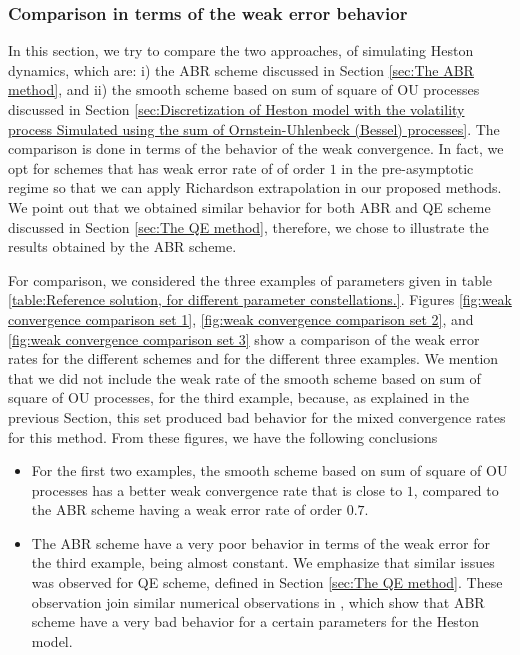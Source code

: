 \subsubsection{Comparison in terms of  the weak error behavior}\label{sec:Comparison in terms of  the weak error behavior}
In this section, we try to compare  the two  approaches,  of simulating Heston dynamics, which are:  i) the ABR scheme discussed in Section \ref{sec:The ABR method}, and ii) the smooth scheme based on sum of square of OU processes discussed in Section \ref{sec:Discretization of Heston model with the volatility process Simulated using the sum of  Ornstein-Uhlenbeck (Bessel) processes}. The comparison is done in terms of the behavior of the weak convergence. In fact, we opt for schemes that has weak error rate of of order $1$ in the pre-asymptotic regime so that we can apply Richardson extrapolation in our proposed methods. We point out that we obtained similar behavior for both  ABR and QE scheme discussed in Section \ref{sec:The QE method}, therefore, we chose to illustrate the results obtained by the ABR scheme.

For comparison, we considered the three examples of parameters given in table \ref{table:Reference solution, for different parameter constellations.}. Figures \ref{fig:weak convergence comparison set 1}, \ref{fig:weak convergence comparison set 2}, and \ref{fig:weak convergence comparison set 3} show a comparison of the weak error rates for the different schemes and for the different three examples.  We mention that we did not include the weak rate of  the smooth scheme based on sum of square of OU processes, for the third example, because, as explained in the previous Section, this set produced bad behavior for the mixed convergence rates for this method.  From these figures, we have the following conclusions
\begin{itemize}
\item For the first two examples,   the smooth scheme based on sum of square of OU processes has a better weak convergence rate  that is close to $1$, compared to the ABR scheme having a weak error rate of order $0.7$.
\item The ABR scheme have a very poor behavior in terms of the weak error for the third example, being almost constant. We emphasize that similar issues was observed for QE scheme, defined in Section \ref{sec:The QE method}. These observation join similar numerical observations in \cite{lord2010comparison}, which show that ABR scheme have a very bad behavior for a certain parameters for the Heston model.
\end{itemize}
